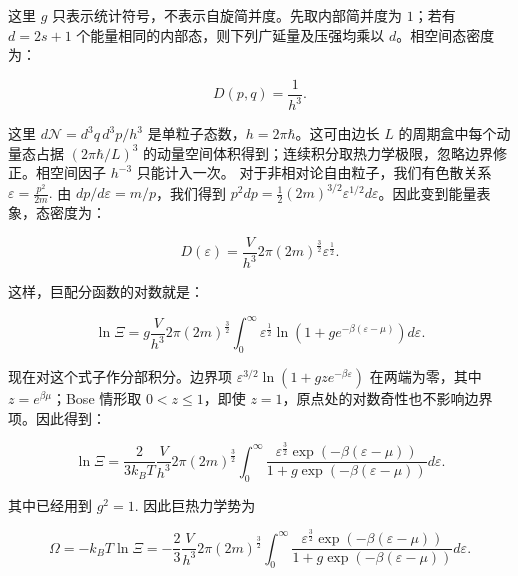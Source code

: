 这里 $g$ 只表示统计符号，不表示自旋简并度。先取内部简并度为 $1$；若有 $d=2s+1$ 个能量相同的内部态，则下列广延量及压强均乘以 $d$。相空间态密度为：
\begin{linenomath}\begin{equation}
    D(p,q) = \frac{1}{h^3}.
\end{equation}\end{linenomath}
这里 $d\mathcal{N}=d^3q\,d^3p/h^3$ 是单粒子态数，$h=2\pi\hbar$。这可由边长 $L$ 的周期盒中每个动量态占据 $(2\pi\hbar/L)^3$ 的动量空间体积得到；连续积分取热力学极限，忽略边界修正。相空间因子 $h^{-3}$ 只能计入一次。
对于非相对论自由粒子，我们有色散关系 $\varepsilon = \frac{p^2}{2m}.$ 由 $dp/d\varepsilon=m/p$，我们得到 $p^2dp=\frac12(2m)^{3/2}\varepsilon^{1/2}d\varepsilon$。因此变到能量表象，态密度为：
\begin{linenomath}\begin{equation}
    D(\varepsilon) = \frac{V}{h^3} 2\pi (2m)^{\frac32} \varepsilon^{\frac12}.
\end{equation}\end{linenomath}
这样，巨配分函数的对数就是：
\begin{linenomath}\begin{equation}
    \ln \varXi = g \frac{V}{h^3} 2\pi (2m)^{\frac32} \int_{0}^{\infty} \varepsilon^{\frac{1}{2}} \ln \left( 1 +g e^{-\beta(\varepsilon - \mu)} \right) d\varepsilon.
\end{equation}\end{linenomath}
现在对这个式子作分部积分。边界项 $\varepsilon^{3/2}\ln(1+gz e^{-\beta\varepsilon})$ 在两端为零，其中 $z=e^{\beta\mu}$；Bose 情形取 $0<z\leq1$，即使 $z=1$，原点处的对数奇性也不影响边界项。因此得到：
\begin{linenomath}\begin{equation}
    \ln \varXi = \frac{2}{3k_BT}\frac{V}{h^3} 2\pi (2m)^{\frac32} \int_{0}^{\infty} \frac{\varepsilon^{\frac{3}{2}}\exp(-\beta(\varepsilon - \mu))}{1 + g\exp(-\beta(\varepsilon - \mu))} d\varepsilon.
\end{equation}\end{linenomath}
其中已经用到 $g^2=1.$ 因此巨热力学势为
\begin{linenomath}\begin{equation}
    \Omega = -k_B T \ln \varXi = - \frac{2}{3}\frac{V}{h^3} 2\pi (2m)^{\frac32} \int_{0}^{\infty} \frac{\varepsilon^{\frac{3}{2}}\exp(-\beta(\varepsilon - \mu))}{1 + g\exp(-\beta(\varepsilon - \mu))} d\varepsilon.
\end{equation}\end{linenomath}
